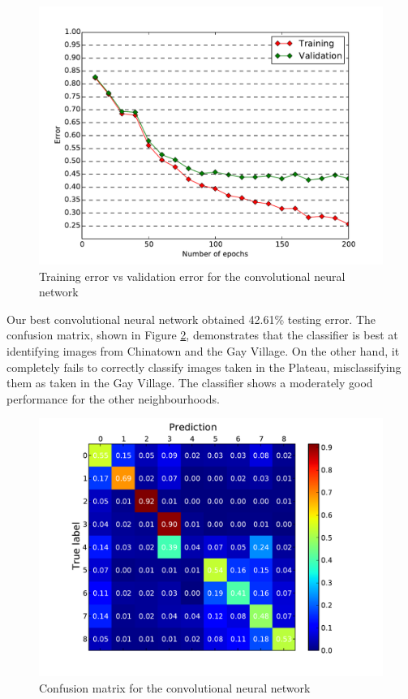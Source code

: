 \documentclass{acm_proc_article-sp}
\begin{document}
\begin{figure}[h!]
\includegraphics[width=\linewidth]{convnet_learning.pdf}
		\caption{Training error vs validation error for the convolutional neural network}
		\label{fig:convnet_trainvsvalid}
\end{figure}

Our best convolutional neural network obtained 42.61\% testing error. The confusion matrix, shown in Figure \ref{fig:convnet_confusion}, demonstrates that the classifier is best at identifying images from Chinatown and the Gay Village. On the other hand, it completely fails to correctly classify images taken in the Plateau, misclassifying them as taken in the Gay Village. The classifier shows a moderately good performance for the other neighbourhoods.

\begin{figure}[h!]
\includegraphics[width=\linewidth]{convnet_confusion.pdf}
		\caption{Confusion matrix for the convolutional neural network}
		\label{fig:convnet_confusion}
\end{figure}
\end{document}
